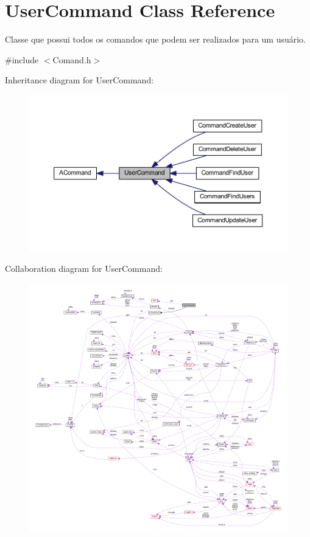 \hypertarget{class_user_command}{\section{User\-Command Class Reference}
\label{class_user_command}
}


Classe que possui todos os comandos que podem ser realizados para um usuário.  




{\ttfamily \#include $<$Comand.\-h$>$}



Inheritance diagram for User\-Command\-:\nopagebreak
\begin{figure}[H]
\begin{center}
\leavevmode
\includegraphics[width=350pt]{class_user_command__inherit__graph}
\end{center}
\end{figure}


Collaboration diagram for User\-Command\-:\nopagebreak
\begin{figure}[H]
\begin{center}
\leavevmode
\includegraphics[width=350pt]{class_user_command__coll__graph}
\end{center}
\end{figure}
